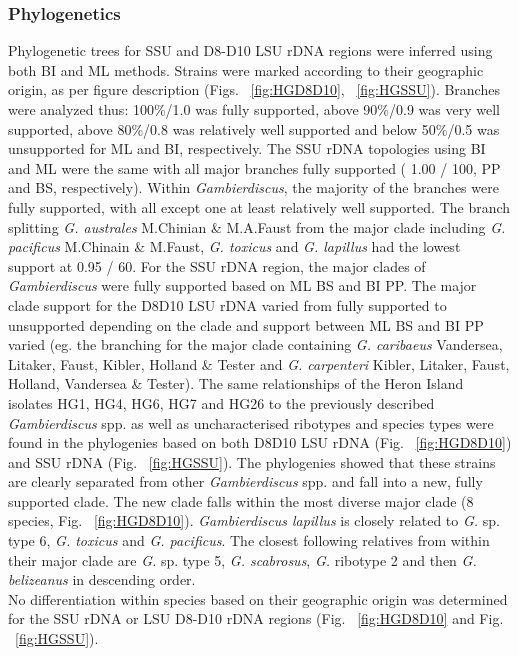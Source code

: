 \documentclass[12pt]{article}
\begin{document}
\subsubsection{Phylogenetics}
\FloatBarrier 
Phylogenetic trees for SSU and D8-D10 LSU rDNA regions were inferred using both BI and ML methods. 
Strains were marked according to their geographic origin, as per figure description (Figs. ~\ref{fig:HGD8D10}, ~\ref{fig:HGSSU}). 
Branches were analyzed thus: 100\%/1.0 was fully supported, above 90\%/0.9 was very well supported, above 80\%/0.8 was relatively well supported and below 50\%/0.5 was unsupported for ML and BI, respectively.
The SSU rDNA  topologies using BI and ML were the same with all major branches fully supported ( 1.00 / 100, PP and BS, respectively). 
Within \emph{Gambierdiscus}, the majority of the branches were fully supported, with all except one at least relatively well supported. 
The branch splitting \emph{G. australes} M.Chinian \& M.A.Faust from the major clade including \emph{G. pacificus} M.Chinain \&
M.Faust, \emph{G. toxicus} and \emph{G. lapillus} had the lowest support at 0.95 / 60.
For the SSU rDNA region, the major clades of \textit{Gambierdiscus} were fully supported based on ML BS and BI PP. 
The major clade support for the D8D10 LSU rDNA varied from fully supported to unsupported depending on the clade and support between ML BS and BI PP varied (eg. the branching for the major clade containing \emph{G. caribaeus} Vandersea, Litaker, Faust, Kibler, Holland \& Tester and \emph{G. carpenteri} Kibler, Litaker, Faust, Holland, Vandersea \& Tester). 
The same relationships of the Heron Island isolates HG1, HG4, HG6, HG7 and HG26 to the previously described \emph{Gambierdiscus} spp. as well as uncharacterised ribotypes and species types were found in the phylogenies based on both D8D10 LSU rDNA (Fig. ~\ref{fig:HGD8D10}) and SSU rDNA (Fig. ~\ref{fig:HGSSU}). 
The phylogenies showed that these strains are clearly separated from other \emph{Gambierdiscus} spp. and fall into a new, fully supported clade. 
The new clade falls within the most diverse major clade (8 species, Fig. ~\ref{fig:HGD8D10}). 
\emph{Gambierdiscus lapillus} is closely related to \emph{G.} sp. type 6, \emph{G. toxicus} and \emph{G. pacificus}. 
The closest following relatives from within their major clade are \emph{G.} sp. type 5, \emph{G. scabrosus}, \emph{G.} ribotype 2 and then \emph{G. belizeanus} in descending order. \\
No differentiation within species based on their geographic origin was determined for the SSU rDNA or LSU D8-D10 rDNA regions (Fig. ~\ref{fig:HGD8D10} and Fig. ~\ref{fig:HGSSU}).
\end{document}
